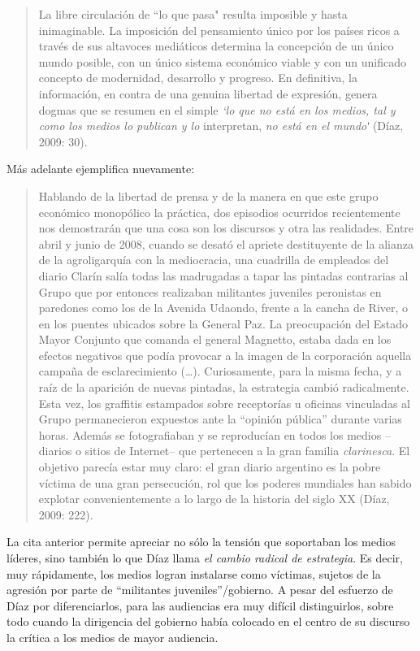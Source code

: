 \begin{quote}
La libre circulación de ``lo que pasa" resulta imposible y hasta inimaginable. La imposición del pensamiento único por los países ricos a través de sus altavoces mediáticos determina la concepción de un único mundo posible, con un único sistema económico viable y con un unificado concepto de modernidad, desarrollo y progreso. En definitiva, la información, en contra de una genuina libertad de expresión, genera dogmas que se resumen en el simple \emph{`lo que no está en los medios, tal y como los medios lo publican y lo} interpretan, \emph{no está en el mundoʹ} (Díaz, 2009: 30).
\end{quote}

Más adelante ejemplifica nuevamente:

\begin{quote}
Hablando de la libertad de prensa y de la manera en que este grupo económico monopólico la práctica, dos episodios ocurridos recientemente nos demostrarán que una cosa son los discursos y otra las realidades. Entre abril y junio de 2008, cuando se desató el apriete destituyente de la alianza de la agroligarquía con la mediocracia, una cuadrilla de empleados del diario Clarín salía todas las madrugadas a tapar las pintadas contrarias al Grupo que por entonces realizaban militantes juveniles peronistas en paredones como los de la Avenida Udaondo, frente a la cancha de River, o en los puentes ubicados sobre la General Paz. La preocupación del Estado Mayor Conjunto que comanda el general Magnetto, estaba dada en los efectos negativos que podía provocar a la imagen de la corporación aquella campaña de esclarecimiento (\ldots). Curiosamente, para la misma fecha, y a raíz de la aparición de nuevas pintadas, la estrategia cambió radicalmente. Esta vez, los graffitis estampados sobre receptorías u oficinas vinculadas al Grupo permanecieron expuestos ante la ``opinión pública'' durante varias horas. Además se fotografiaban y se reproducían en todos los medios --diarios o sitios de Internet-- que pertenecen a la gran familia \emph{clarinesca}. El objetivo parecía estar muy claro: el gran diario argentino es la pobre víctima de una gran persecución, rol que los poderes mundiales han sabido explotar convenientemente a lo largo de la historia del siglo XX (Díaz, 2009: 222).
\end{quote}

La cita anterior permite apreciar no sólo la tensión que soportaban los medios líderes, sino también lo que Díaz llama \emph{el cambio radical de estrategia}. Es decir, muy rápidamente, los medios logran instalarse como víctimas, sujetos de la agresión por parte de ``militantes juveniles''/gobierno. A pesar del esfuerzo de Díaz por diferenciarlos, para las audiencias era muy difícil distinguirlos, sobre todo cuando la dirigencia del gobierno había colocado en el centro de su discurso la crítica a los medios de mayor audiencia.

